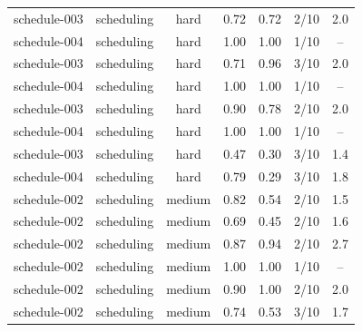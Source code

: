 \begin{table}[t]
\begin{tabular}{llccccc}
schedule-003 & scheduling & hard & 0.72 & 0.72 & 2/10 & 2.0 \\
schedule-004 & scheduling & hard & 1.00 & 1.00 & 1/10 & -- \\
schedule-003 & scheduling & hard & 0.71 & 0.96 & 3/10 & 2.0 \\
schedule-004 & scheduling & hard & 1.00 & 1.00 & 1/10 & -- \\
schedule-003 & scheduling & hard & 0.90 & 0.78 & 2/10 & 2.0 \\
schedule-004 & scheduling & hard & 1.00 & 1.00 & 1/10 & -- \\
schedule-003 & scheduling & hard & 0.47 & 0.30 & 3/10 & 1.4 \\
schedule-004 & scheduling & hard & 0.79 & 0.29 & 3/10 & 1.8 \\
schedule-002 & scheduling & medium & 0.82 & 0.54 & 2/10 & 1.5 \\
schedule-002 & scheduling & medium & 0.69 & 0.45 & 2/10 & 1.6 \\
schedule-002 & scheduling & medium & 0.87 & 0.94 & 2/10 & 2.7 \\
schedule-002 & scheduling & medium & 1.00 & 1.00 & 1/10 & -- \\
schedule-002 & scheduling & medium & 0.90 & 1.00 & 2/10 & 2.0 \\
schedule-002 & scheduling & medium & 0.74 & 0.53 & 3/10 & 1.7 \\
\bottomrule
\end{tabular}
\end{table}